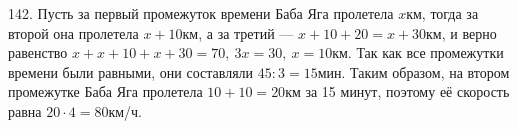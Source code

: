 142. Пусть за первый промежуток времени Баба Яга пролетела $x$км, тогда за второй она пролетела $x+10$км, а за третий --- $x+10+20=x+30$км, и верно равенство $x+x+10+x+30=70,\ 3x=30,\ x=10$км. Так как все промежутки времени были равными, они составляли $45:3=15$мин. Таким образом, на втором промежутке Баба Яга пролетела $10+10=20$км за 15 минут, поэтому её скорость равна $20\cdot4=80$км/ч.\\
